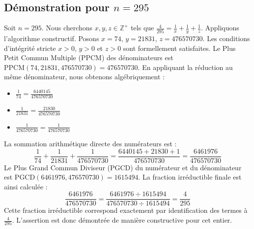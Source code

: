 \documentclass[11pt,a4paper]{article}
\begin{document}
\subsection{Démonstration pour $n = 295$}
Soit $n = 295$. Nous cherchons $x, y, z \in \mathbb{Z}^{+}$ tels que $\frac{4}{295} = \frac{1}{x} + \frac{1}{y} + \frac{1}{z}$.
Appliquons l'algorithme constructif. Posons $x = 74$, $y = 21831$, $z = 476570730$.
Les conditions d'intégrité stricte $x > 0$, $y > 0$ et $z > 0$ sont formellement satisfaites.
Le Plus Petit Commun Multiple (PPCM) des dénominateurs est $\text{PPCM}(74, 21831, 476570730) = 476570730$.
En appliquant la réduction au même dénominateur, nous obtenons algébriquement :
\begin{itemize}
    \item $\frac{1}{74} = \frac{6440145}{476570730}$
    \item $\frac{1}{21831} = \frac{21830}{476570730}$
    \item $\frac{1}{476570730} = \frac{1}{476570730}$
\end{itemize}
La sommation arithmétique directe des numérateurs est :
$$ \frac{1}{74} + \frac{1}{21831} + \frac{1}{476570730} = \frac{6440145 + 21830 + 1}{476570730} = \frac{6461976}{476570730} $$
Le Plus Grand Commun Diviseur (PGCD) du numérateur et du dénominateur est $\text{PGCD}(6461976, 476570730) = 1615494$.
La fraction irréductible finale est ainsi calculée :
$$ \frac{6461976}{476570730} = \frac{6461976 \div 1615494}{476570730 \div 1615494} = \frac{4}{295} $$
Cette fraction irréductible correspond exactement par identification des termes à $\frac{4}{295}$. L'assertion est donc démontrée de manière constructive pour cet entier.
\end{document}
